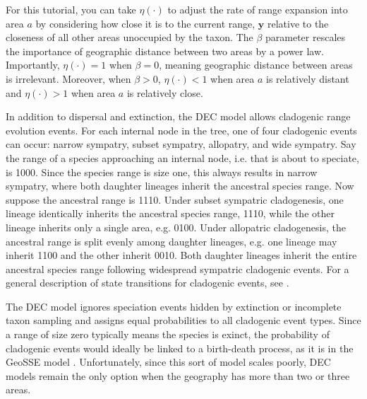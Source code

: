 \documentclass[11pt]{article}
\begin{document}
For this tutorial, you can take $\eta(\cdot)$ to adjust the rate of range expansion into area $a$ by considering how close it is to the current range, $\textbf{y}$ relative to the closeness of all other areas unoccupied by the taxon.
The $\beta$ parameter rescales the importance of geographic distance between two areas by a power law.
Importantly, $\eta(\cdot) = 1$ when $\beta=0$, meaning geographic distance between areas is irrelevant.
Moreover, when $\beta > 0$, $\eta(\cdot) < 1$ when area $a$ is relatively distant and $\eta(\cdot) > 1$ when area $a$ is relatively close.

In addition to dispersal and extinction, the DEC model allows cladogenic range evolution events.
For each internal node in the tree, one of four cladogenic events can occur: narrow sympatry, subset sympatry, allopatry, and wide sympatry.
Say the range of a species approaching an internal node, i.e. that is about to speciate, is 1000.
Since the species range is size one, this always results in narrow sympatry, where both daughter lineages inherit the ancestral species range.
Now suppose the ancestral range is 1110.
Under subset sympatric cladogenesis, one lineage identically inherits the ancestral species range, 1110, while the other lineage inherits only a single area, e.g. 0100.
Under allopatric cladogenesis, the ancestral range is split evenly among daughter lineages, e.g. one lineage may inherit 1100 and the other inherit 0010.
Both daughter lineages inherit the entire ancestral species range following widespread sympatric cladogenic events.
For a general description of state transitions for cladogenic events, see \citet{matzke13}.

The DEC model ignores speciation events hidden by extinction or incomplete taxon sampling and assigns equal probabilities to all cladogenic event types.
Since a range of size zero typically means the species is exinct, the probability of cladogenic events would ideally be linked to a birth-death process, as it is in the GeoSSE model \citep{goldberg11}.
Unfortunately, since this sort of model scales poorly, DEC models remain the only option when the geography has more than two or three areas.
\end{document}
